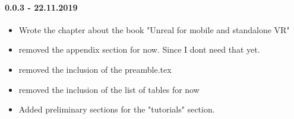 \paragraph{0.0.3 - 22.11.2019}

\begin{itemize}
\item Wrote the chapter about the book "Unreal for mobile and standalone VR"
\item removed the appendix section for now. Since I dont need that yet.
\item removed the inclusion of the preamble.tex
\item removed the inclusion of the list of tables for now
\item Added preliminary sections for the "tutorials" section.
\end{itemize}


